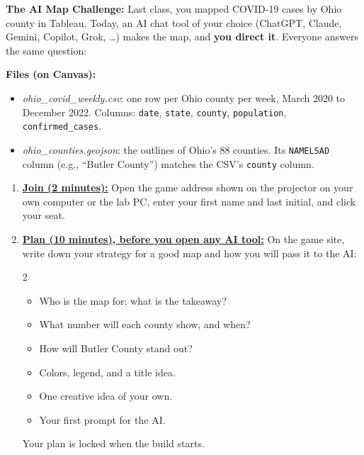 \documentclass[letterpaper,addpoints, 11pt]{exam}
\begin{document}
\begin{questions}


\question[0] \textbf{The AI Map Challenge:} Last class, you mapped COVID-19 cases by Ohio county in Tableau. Today, an AI chat tool of your choice (ChatGPT, Claude, Gemini, Copilot, Grok, \ldots) makes the map, and \textbf{you direct it}. Everyone answers the same question:

\begin{center}
\end{center}

\noindent \textbf{Files (on Canvas):}
\begin{itemize}[nosep]
	\item \textit{ohio\_covid\_weekly.csv}: one row per Ohio county per week, March 2020 to December 2022. Columns: \texttt{date}, \texttt{state}, \texttt{county}, \texttt{population}, \texttt{confirmed\_cases}.
	\item \textit{ohio\_counties.geojson}: the outlines of Ohio's 88 counties. Its \texttt{NAMELSAD} column (e.g., ``Butler County'') matches the CSV's \texttt{county} column.
\end{itemize}

\begin{enumerate}[label=(\Alph*)]
	\item \underline{\textbf{Join (2 minutes):}} Open the game address shown on the projector on your own computer or the lab PC, enter your first name and last initial, and click your seat.

	\item \underline{\textbf{Plan (10 minutes), before you open any AI tool:}} On the game site, write down your strategy for a good map and how you will pass it to the AI:
	\vspace{-2mm}
	\begin{multicols}{2}
	\begin{itemize}[nosep]
		\item Who is the map for; what is the takeaway?
		\item What number will each county show, and when?
		\item How will Butler County stand out?
		\item Colors, legend, and a title idea.
		\item One creative idea of your own.
		\item Your first prompt for the AI.
	\end{itemize}
	\end{multicols}
	\vspace{-3mm}
	Your plan is locked when the build starts.


\end{enumerate}
\end{questions}
\end{document}
